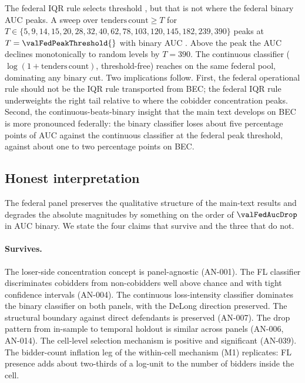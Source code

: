 The federal IQR rule selects threshold \valFedFLthreshold{}, but
that is not where the federal binary AUC peaks. A sweep over
$\mathrm{tenders\,count} \geq T$ for $T \in \{5, 9, 14, 15, 20,
28, 32, 40, 62, 78, 103, 120, 145, 182, 239, 390\}$ peaks at
$T = \valFedPeakThreshold{}$ with binary AUC
\valFedPeakAUC{}. Above the peak the AUC declines monotonically
to random levels by $T = 390$. The continuous classifier
($\log(1 + \mathrm{tenders\,count})$, threshold-free) reaches
\valFedAucContinuous{} on the same federal pool, dominating any
binary cut. Two implications follow. First, the federal
operational rule should not be the IQR rule transported from BEC;
the federal IQR rule underweights the right tail relative to
where the cobidder concentration peaks. Second, the
continuous-beats-binary insight that the main text develops on
BEC is more pronounced federally: the binary classifier loses
about five percentage points of AUC against the continuous
classifier at the federal peak threshold, against about one to
two percentage points on BEC.

\subsection{Honest interpretation}
\label{app:comprasnet_interpretation}

The federal panel preserves the qualitative structure of the
main-text results and degrades the absolute magnitudes by
something on the order of $\valFedAucDrop$ in AUC binary. We
state the four claims that survive and the three that do not.

\paragraph{Survives.} The loser-side concentration concept is
panel-agnostic (AN-001). The FL classifier discriminates
cobidders from non-cobidders well above chance and with tight
confidence intervals (AN-004). The continuous loss-intensity
classifier dominates the binary classifier on both panels, with
the DeLong direction preserved. The structural boundary against
direct defendants is preserved (AN-007). The drop pattern from
in-sample to temporal holdout is similar across panels
(AN-006, AN-014). The cell-level selection mechanism is
positive and significant (AN-039). The bidder-count inflation
leg of the within-cell mechanism (M1) replicates: FL presence
adds about two-thirds of a log-unit to the number of bidders
inside the cell.

